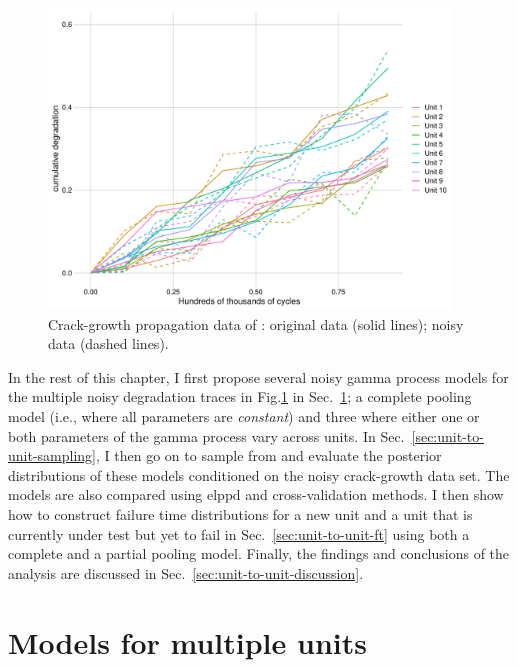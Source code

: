 \begin{figure}
   \centering
   \includegraphics[width=0.95\textwidth]{./figures/ch-5/noisy-crack-growth-data.pdf}
   \caption{Crack-growth propagation data of \citet{rodriguez-picon2018}: original data (solid lines); noisy data (dashed lines).}
   \label{fig:crack-growth-w-noise}
\end{figure}

In the rest of this chapter, I first propose several noisy gamma process models for the multiple noisy degradation traces in Fig.\ref{fig:crack-growth-w-noise} in Sec.~\ref{sec:unit-to-unit-models}; a complete pooling model (i.e., where all parameters are \emph{constant}) and three where either one or both parameters of the gamma process vary across units. In Sec.~\ref{sec:unit-to-unit-sampling}, I then go on to sample from and evaluate the posterior distributions of these models conditioned on the noisy crack-growth data set. The models are also compared using $\mbox{elppd}$ and cross-validation methods. I then show how to construct failure time distributions for a new unit and a unit that is currently under test but yet to fail in Sec.~\ref{sec:unit-to-unit-ft} using both a complete and a partial pooling model. Finally, the findings and conclusions of the analysis are discussed in Sec.~\ref{sec:unit-to-unit-discussion}.

\section{Models for multiple units} \label{sec:unit-to-unit-models}

